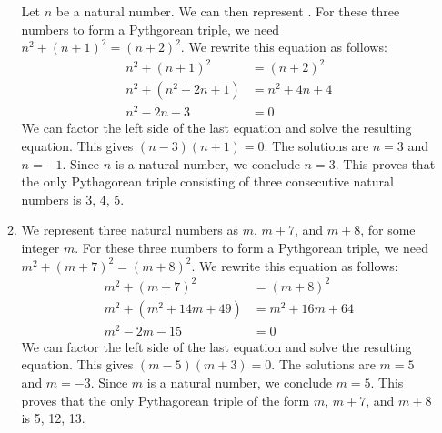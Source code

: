 \begin{enumerate}
\begin{enumerate}
\begin{myproof}
Let $n$ be a natural number.  We can then represent .  For these three numbers to form a Pythgorean triple, we need $n^2 + (n + 1)^2 = (n + 2)^2$.  We rewrite this equation as follows:
\begin{align*}
n^2 + (n + 1)^2 &= (n + 2)^2 \\
n^2 + \left( n^2 + 2n + 1 \right) &= n^2 + 4n + 4 \\
n^2 - 2n - 3 &= 0
\end{align*}
We can factor the left side of the last equation and solve the resulting equation.  This gives $(n - 3)(n + 1) = 0$.  The solutions are $n = 3$ and $n = -1$.  Since $n$ is a natural number, we conclude $n = 3$.  This proves that the only Pythagorean triple consisting of three consecutive natural numbers is 3, 4, 5.
\end{myproof}


\item We represent three natural numbers as $m$, $m + 7$, and $m +8$, for some integer $m$.  For these three numbers to form a Pythgorean triple, we need $m^2 + (m + 7)^2 = (m + 8)^2$.  We rewrite this equation as follows:
\begin{align*}
m^2 + (m + 7)^2 &= (m + 8)^2 \\
m^2 + \left( m^2 + 14m + 49 \right) &= m^2 + 16m + 64 \\
m^2 - 2m - 15 &= 0
\end{align*}
We can factor the left side of the last equation and solve the resulting equation.  This gives $(m - 5)(m + 3) = 0$.  The solutions are $m = 5$ and $m = -3$.  Since $m$ is a natural number, we conclude $m = 5$.  This proves that the only Pythagorean triple of the form $m$, $m + 7$, and $m + 8$ is 5, 12, 13.
\end{enumerate}

\end{enumerate}

\hbreak
\endinput
